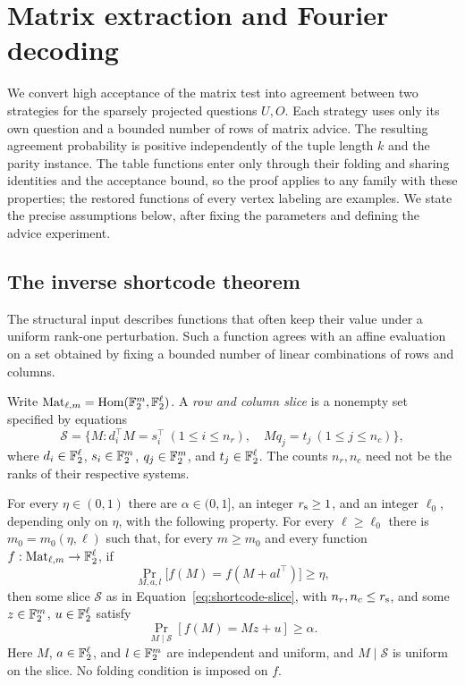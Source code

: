 \section{Matrix extraction and Fourier decoding}
\label{sec:matrix}

We convert high acceptance of the matrix test into agreement between two
strategies for the sparsely projected questions $U,O$.  Each strategy
uses only its own question and a bounded number of rows of matrix advice.
The resulting agreement probability is positive independently of the tuple
length $k$ and the parity instance.  The table functions enter only through
their folding and sharing identities and the acceptance bound, so the proof
applies to any family with these properties; the restored functions of every vertex
labeling are examples.  We state the precise assumptions below, after
fixing the parameters and defining the advice experiment.

\subsection{The inverse shortcode theorem}

The structural input describes functions that often keep their value
under a uniform rank-one perturbation.  Such a function agrees with an
affine evaluation on a set obtained by fixing a bounded number of linear
combinations of rows and columns.

Write $\operatorname{Mat}_{\ell,m}=\operatorname{Hom}(\mathbb F_2^m,\mathbb F_2^\ell)$.
A \emph{row and column slice} is a nonempty set specified by equations
\begin{equation}
 \mathcal S=
 \{M:d_i^\top M=s_i^\top\ (1\le i\le n_r),\quad
          Mq_j=t_j\ (1\le j\le n_c)\},
 \label{eq:shortcode-slice}
\end{equation}
where $d_i\in\mathbb F_2^\ell$, $s_i\in\mathbb F_2^m$, $q_j\in\mathbb F_2^m$, and
$t_j\in\mathbb F_2^\ell$.  The counts $n_r,n_c$ need not be the ranks of their
respective systems.

\begin{theorem}
\label{thm:shortcode}
For every $\eta\in(0,1)$ there are $\alpha\in(0,1]$, an integer
$r_{\rm s}\ge1$, and an integer $\ell_0$, depending only on $\eta$,
with the following property.  For every $\ell\ge\ell_0$ there is
$m_0=m_0(\eta,\ell)$ such that, for every $m\ge m_0$ and every function
$f:\operatorname{Mat}_{\ell,m}\to\mathbb F_2^\ell$, if
\begin{equation}
 \Pr_{M,a,l}\bigl[f(M)=f(M+a l^\top)\bigr]\ge\eta,
 \label{eq:shortcode-acceptance}
\end{equation}
then some slice $\mathcal S$ as in Equation~\eqref{eq:shortcode-slice},
with $n_r,n_c\le r_{\rm s}$, and some $z\in\mathbb F_2^m$, $u\in\mathbb F_2^\ell$
satisfy
\begin{equation}
 \Pr_{M\mid\mathcal S}[f(M)=Mz+u]\ge\alpha.
 \label{eq:shortcode-conclusion}
\end{equation}
Here $M$, $a\in\mathbb F_2^\ell$, and $l\in\mathbb F_2^m$ are independent and
uniform, and $M\mid\mathcal S$ is uniform on the slice.  No folding
condition is imposed on $f$.
\end{theorem}


